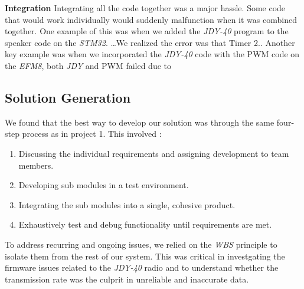 \documentclass{article}
\begin{document}
\textbf{Integration}
Integrating all the code together was a major hassle. Some code that would work individually would suddenly malfunction when it was combined together.
One example of this was when we added the \textit{JDY-40} program to the speaker code on the \textit{STM32}. \dots We realized the error was that Timer 2..
Another key example was when we incorporated the \textit{JDY-40} code with the PWM code on the \textit{EFM8}, both \textit{JDY} and PWM failed due to




\subsection{Solution Generation}

We found that the best way to develop our solution was through the same four-step process as in project 1. This involved : \\

\begin{enumerate}
  \item Discussing the individual requirements and assigning development to team members.
  \item Developing sub modules in a test environment.
  \item Integrating the sub modules into a single, cohesive product.
  \item Exhaustively test and debug functionality until requirements are met.
\end{enumerate}

To address recurring and ongoing issues, we relied on the \textit{WBS} principle to isolate them from the rest of our system.
This was critical in investgating the firmware issues related to the \textit{JDY-40} radio and to understand whether the transmission rate was the culprit
in unreliable and inaccurate data.

\
\end{document}
